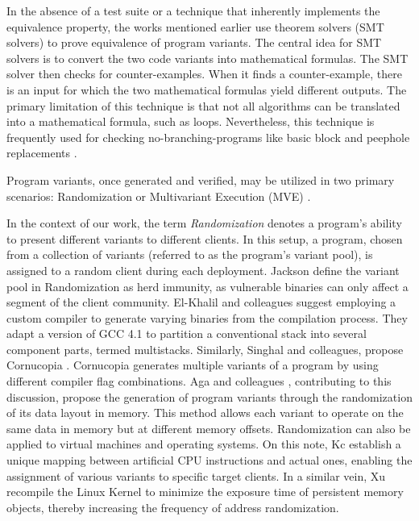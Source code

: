 \begin{checking}
    \label{check_by_smt}
    In the absence of a test suite or a technique that inherently implements the equivalence property, the works mentioned earlier use theorem solvers (SMT solvers) \cite{SMT_solver} to prove equivalence of program variants. 
    The central idea for SMT solvers is to convert the two code variants into mathematical formulas. 
    The SMT solver then checks for counter-examples. 
    When it finds a counter-example, there is an input for which the two mathematical formulas yield different outputs. 
    The primary limitation of this technique is that not all algorithms can be translated into a mathematical formula, such as loops. 
    Nevertheless, this technique is frequently used for checking no-branching-programs like basic block and peephole replacements \cite{SuperoptimizationScaling}.
\end{checking}




Program variants, once generated and verified, may be utilized in two primary scenarios: Randomization or Multivariant Execution (MVE) \cite{jackson}. 


\begin{strategy}[Randomization]
    \label{randomization}
    In the context of our work, the term \emph{Randomization} denotes a program's ability to present different variants to different clients. 
    In this setup, a program, chosen from a collection of variants (referred to as the program's variant pool), is assigned to a random client during each deployment. 
    Jackson \etal \cite{jackson} define the variant pool in Randomization as herd immunity, as vulnerable binaries can only affect a segment of the client community. 
    El-Khalil and colleagues \cite{ElKhalil2004} suggest employing a custom compiler to generate varying binaries from the compilation process. 
    They adapt a version of GCC 4.1 to partition a conventional stack into several component parts, termed multistacks. 
    Similarly, Singhal and colleagues, propose Cornucopia \cite{cornucopia}.
    Cornucopia generates multiple variants of a program by using different compiler flag combinations.
    Aga and colleagues \cite{aga2019smokestack}, contributing to this discussion, propose the generation of program variants through the randomization of its data layout in memory. 
    This method allows each variant to operate on the same data in memory but at different memory offsets. 
    Randomization can also be applied to virtual machines and operating systems. On this note, Kc \etal \cite{Kc03} establish a unique mapping between artificial CPU instructions and actual ones, enabling the assignment of various variants to specific target clients. 
    In a similar vein, Xu \etal \cite{xu2020merr} recompile the Linux Kernel to minimize the exposure time of persistent memory objects, thereby increasing the frequency of address randomization.
\end{strategy}


